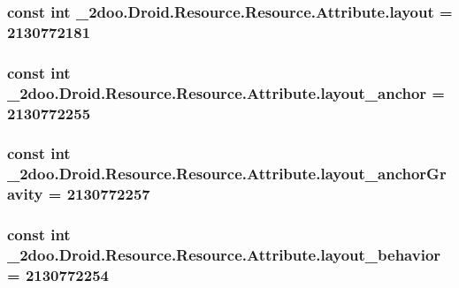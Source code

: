 \hypertarget{class__2doo_1_1_droid_1_1_resource_1_1_attribute_5a0bfc8b05e1a538670ceea8d8338081}{
\subsubsection[{layout}]{\setlength{\rightskip}{0pt plus 5cm}const int \_\-2doo.Droid.Resource.Resource.Attribute.layout = 2130772181}}
\label{class__2doo_1_1_droid_1_1_resource_1_1_attribute_5a0bfc8b05e1a538670ceea8d8338081}


\hypertarget{class__2doo_1_1_droid_1_1_resource_1_1_attribute_6fcb2a283d671b42d8fee2859e40d235}{
\subsubsection[{layout\_\-anchor}]{\setlength{\rightskip}{0pt plus 5cm}const int \_\-2doo.Droid.Resource.Resource.Attribute.layout\_\-anchor = 2130772255}}
\label{class__2doo_1_1_droid_1_1_resource_1_1_attribute_6fcb2a283d671b42d8fee2859e40d235}


\hypertarget{class__2doo_1_1_droid_1_1_resource_1_1_attribute_d6832eae6d167033b8cdab867e83eecf}{
\subsubsection[{layout\_\-anchorGravity}]{\setlength{\rightskip}{0pt plus 5cm}const int \_\-2doo.Droid.Resource.Resource.Attribute.layout\_\-anchorGravity = 2130772257}}
\label{class__2doo_1_1_droid_1_1_resource_1_1_attribute_d6832eae6d167033b8cdab867e83eecf}


\hypertarget{class__2doo_1_1_droid_1_1_resource_1_1_attribute_5ad50e1eedda7e6b632790cde37329b1}{
\subsubsection[{layout\_\-behavior}]{\setlength{\rightskip}{0pt plus 5cm}const int \_\-2doo.Droid.Resource.Resource.Attribute.layout\_\-behavior = 2130772254}}
\label{class__2doo_1_1_droid_1_1_resource_1_1_attribute_5ad50e1eedda7e6b632790cde37329b1}


